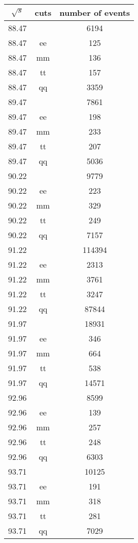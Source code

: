 \begin{tabular}{ccc}
	\toprule
	$\sqrt{s}$ &  cuts &  number of events\\
	\midrule
\num{88.47} &   & \num{ 6194}\\
\num{88.47} &  ee & \num{ 125}\\
\num{88.47} &  mm & \num{ 136}\\
\num{88.47} &  tt & \num{ 157}\\
\num{88.47} &  qq & \num{ 3359}\\
\num{89.47} &   & \num{ 7861}\\
\num{89.47} &  ee & \num{ 198}\\
\num{89.47} &  mm & \num{ 233}\\
\num{89.47} &  tt & \num{ 207}\\
\num{89.47} &  qq & \num{ 5036}\\
\num{90.22} &   & \num{ 9779}\\
\num{90.22} &  ee & \num{ 223 }\\
\num{90.22} &  mm & \num{ 329}\\
\num{90.22} &  tt & \num{ 249}\\
\num{90.22} &  qq & \num{ 7157}\\
\num{91.22} &   & \num{ 114394}\\
\num{91.22} &  ee & \num{ 2313}\\
\num{91.22} &  mm & \num{ 3761}\\
\num{91.22} &  tt & \num{ 3247}\\
\num{91.22} &  qq & \num{ 87844}\\
\num{91.97} &   & \num{ 18931}\\
\num{91.97} &  ee & \num{ 346}\\
\num{91.97} &  mm & \num{ 664}\\
\num{91.97} &  tt & \num{ 538}\\
\num{91.97} &  qq & \num{ 14571}\\
\num{92.96} &   & \num{ 8599}\\
\num{92.96} &  ee & \num{ 139}\\
\num{92.96} &  mm & \num{ 257}\\
\num{92.96} &  tt & \num{ 248}\\
\num{92.96} &  qq & \num{ 6303}\\
\num{93.71} &   & \num{ 10125}\\
\num{93.71} &  ee & \num{ 191}\\
\num{93.71} &  mm & \num{ 318}\\
\num{93.71} &  tt & \num{ 281}\\
\num{93.71} &  qq & \num{ 7029}\\
\bottomrule
\end{tabular}
